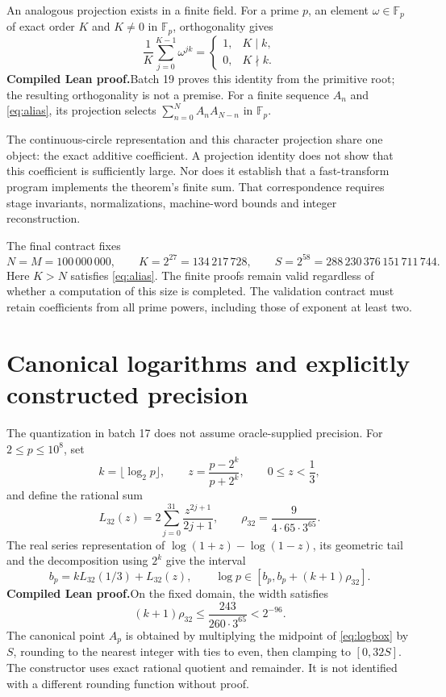 \documentclass[11pt,a4paper]{article}
\theoremstyle{remark}
\newcommand{\paid}{\textbf{Compiled Lean proof.}\space}
\begin{document}
An analogous projection exists in a finite field. For a prime $p$, an element
$\omega\in\mathbb F_p$ of exact order $K$ and $K\ne0$ in $\mathbb F_p$,
orthogonality gives
\[
\frac1K\sum_{j=0}^{K-1}\omega^{jk}
=\begin{cases}1,&K\mid k,\\0,&K\nmid k.\end{cases}
\]
\paid Batch 19 proves this identity from the primitive root;
the resulting orthogonality is not a premise. For a finite sequence $A_n$
and \eqref{eq:alias}, its projection selects
$\sum_{n=0}^N A_nA_{N-n}$ in $\mathbb F_p$.

The continuous-circle representation and this character projection share
one object: the exact additive coefficient. A projection identity does not
show that this coefficient is sufficiently large. Nor does it establish
that a fast-transform program implements the theorem's finite sum.
That correspondence requires stage invariants, normalizations, machine-word
bounds and integer reconstruction.

The final contract fixes
\begin{equation}\label{eq:fixed}
N=M=100\,000\,000,\qquad K=2^{27}=134\,217\,728,
\qquad S=2^{58}=288\,230\,376\,151\,711\,744.
\end{equation}
Here $K>N$ satisfies \eqref{eq:alias}. The finite proofs remain valid
regardless of whether a computation of this size is completed. The validation
contract must retain coefficients from all prime powers, including those
of exponent at least two.

\clearpage
\section{Canonical logarithms and explicitly constructed precision}\label{sec:quant}
The quantization in batch 17 does not assume oracle-supplied precision.
For $2\le p\le10^8$, set
\[
k=\lfloor\log_2p\rfloor,\qquad
z=\frac{p-2^k}{p+2^k},\qquad 0\le z<\frac13,
\]
and define the rational sum
\begin{equation}\label{eq:log32}
L_{32}(z)=2\sum_{j=0}^{31}\frac{z^{2j+1}}{2j+1},\qquad
\rho_{32}=\frac{9}{4\cdot65\cdot3^{65}}.
\end{equation}
The real series representation of $\log(1+z)-\log(1-z)$, its geometric
tail and the decomposition using $2^k$ give the interval
\begin{equation}\label{eq:logbox}
b_p=kL_{32}(1/3)+L_{32}(z),\qquad
\log p\in[b_p,b_p+(k+1)\rho_{32}].
\end{equation}
\paid On the fixed domain, the width satisfies
\[
(k+1)\rho_{32}\le\frac{243}{260\cdot3^{65}}<2^{-96}.
\]
The canonical point $A_p$ is obtained by multiplying the midpoint of
\eqref{eq:logbox} by $S$, rounding to the nearest integer with ties to even,
then clamping to $[0,32S]$. The constructor uses exact rational quotient
and remainder. It is not identified with a different rounding function
without proof.
\end{document}
